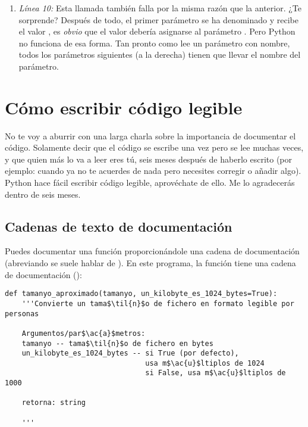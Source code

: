 \begin{enumerate}
\item \emph{Línea 10:} Esta llamada también falla por la misma razón que la anterior. ¿Te sorprende? Después de todo, el primer parámetro se ha denominado  y recibe el valor , es \emph{obvio} que el valor  debería asignarse al parámetro . Pero Python no funciona de esa forma. Tan pronto como lee un parámetro con nombre, todos los parámetros siguientes (a la derecha) tienen que llevar el nombre del parámetro.
\end{enumerate}

\section{Cómo escribir código legible}

No te voy a aburrir con una larga charla sobre la importancia de documentar el código. Solamente decir que el código se escribe una vez pero se lee muchas veces, y que quien más lo va a leer eres tú, seis meses después de haberlo escrito (por ejemplo: cuando ya no te acuerdes de nada pero necesites corregir o añadir algo). Python hace fácil escribir código legible, aprovéchate de ello. Me lo agradecerás dentro de seis meses.

\subsection{Cadenas de texto de documentación}

Puedes documentar una función proporcionándole una cadena de documentación (abreviando se suele hablar de ). En este programa, la función  tiene una cadena de documentación ():

\noindent\begin{minipage}{\textwidth}
\begin{lstlisting}[mathescape=True]
def tamanyo_aproximado(tamanyo, un_kilobyte_es_1024_bytes=True):
    '''Convierte un tama$\til{n}$o de fichero en formato legible por personas

    Argumentos/par$\ac{a}$metros:
    tamanyo -- tama$\til{n}$o de fichero en bytes
    un_kilobyte_es_1024_bytes -- si True (por defecto), 
                                 usa m$\ac{u}$ltiplos de 1024
                                 si False, usa m$\ac{u}$ltiplos de 1000

    retorna: string

    '''
\end{lstlisting}
\end{minipage}

